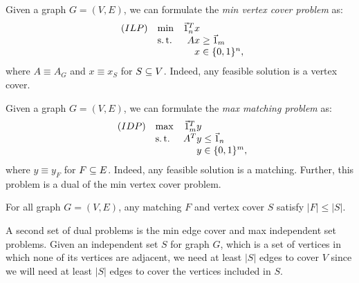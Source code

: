 \begin{defn}
    \label{def:min-vertex-cover-formulation}
    Given a graph $G=(V,E)$, we can formulate the \textit{min vertex cover problem} as:
        \begin{equation*}
        \begin{array}{llr@{}l@{}}
            (ILP)   & \min  &   \one_n^T x  &               \\
                    & \st   &       Ax      &{}\ge \one_m   \\
                    &       &       x       &{}\in \{0,1\}^n,
        \end{array}
        \end{equation*}
    where $A \equiv A_G$ and $x \equiv x_S$ for $S \subseteq V$. Indeed, any feasible solution is a vertex cover.
\end{defn}

\begin{defn}
    \label{def:max-matching-formulation}
    Given a graph $G=(V,E)$, we can formulate the \textit{max matching problem} as:
        \begin{equation*}
        \begin{array}{llr@{}l@{}}
            (IDP)   & \max  &   \one_m^T y  &               \\
                    & \st   &       A^T y   &{}\le \one_n   \\
                    &       &       y       &{}\in \{0,1\}^m,
        \end{array}
        \end{equation*}
    where $y \equiv y_F$ for $F \subseteq E$. Indeed, any feasible solution is a matching. Further, this problem is a dual of the min vertex cover problem.
\end{defn}

\begin{thm}
    \label{thm:weak-duality-min-vtx-cover-max-matching}
    For all graph $G = (V,E)$, any matching $F$ and vertex cover $S$ satisfy $|F| \le |S|$.
\end{thm}

A second set of dual problems is the min edge cover and max independent set problems. Given an independent set $S$ for graph $G$, which is a set of vertices in which none of its vertices are adjacent, we need at least $|S|$ edges to cover $V$ since we will need at least $|S|$ edges to cover the vertices included in $S$.

